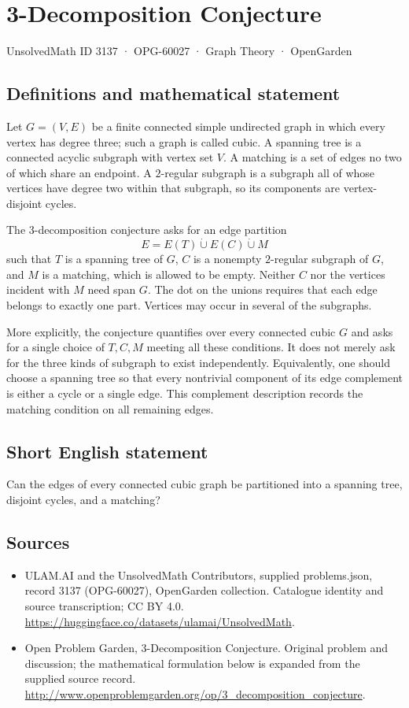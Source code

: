 \documentclass[11pt,a4paper]{article}
\begin{document}
\section*{3-Decomposition Conjecture}\label{3137}
{\small UnsolvedMath ID 3137 · OPG-60027 · Graph Theory · OpenGarden}
\subsection{Definitions and mathematical statement}
Let $G=(V,E)$ be a finite connected simple undirected graph in which
every vertex has degree three; such a graph is called cubic. A
spanning tree is a connected acyclic subgraph with vertex set $V$.
A matching is a set of edges no two of which share an endpoint. A
$2$-regular subgraph is a subgraph all of whose vertices have degree
two within that subgraph, so its components are vertex-disjoint
cycles.

The $3$-decomposition conjecture asks for an edge partition
\[
 E=E(T)\mathbin{\dot\cup}E(C)\mathbin{\dot\cup}M
\]
such that $T$ is a spanning tree of $G$, $C$ is a nonempty
$2$-regular subgraph of $G$, and $M$ is a matching, which is allowed
to be empty. Neither $C$ nor the vertices incident with $M$ need
span $G$. The dot on the unions requires that each edge belongs to
exactly one part. Vertices may occur in several of the subgraphs.

More explicitly, the conjecture quantifies over every connected
cubic $G$ and asks for a single choice of $T,C,M$ meeting all these
conditions. It does not merely ask for the three kinds of subgraph
to exist independently. Equivalently, one should choose a spanning
tree so that every nontrivial component of its edge complement is
either a cycle or a single edge. This complement description records
the matching condition on all remaining edges.
\subsection{Short English statement}
Can the edges of every connected cubic graph be partitioned into a spanning tree, disjoint cycles, and a matching?
\subsection{Sources}
\begin{itemize}
\item[S1] ULAM.AI and the UnsolvedMath Contributors, supplied problems.json, record 3137 (OPG-60027), OpenGarden collection. Catalogue identity and source transcription; CC BY 4.0.
\url{https://huggingface.co/datasets/ulamai/UnsolvedMath}.
\item[S2] Open Problem Garden, 3-Decomposition Conjecture. Original problem and discussion; the mathematical formulation below is expanded from the supplied source record.
\url{http://www.openproblemgarden.org/op/3_decomposition_conjecture}.
\end{itemize}
\end{document}
